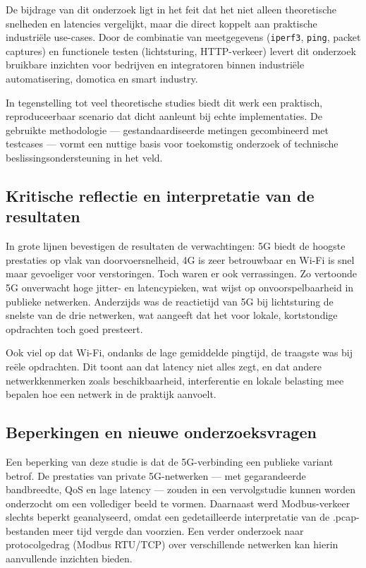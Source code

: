 De bijdrage van dit onderzoek ligt in het feit dat het niet alleen theoretische snelheden en latencies vergelijkt, maar die direct koppelt aan praktische industriële use-cases. Door de combinatie van meetgegevens (\texttt{iperf3}, \texttt{ping}, packet captures) en functionele testen (lichtsturing, HTTP-verkeer) levert dit onderzoek bruikbare inzichten voor bedrijven en integratoren binnen industriële automatisering, domotica en smart industry.

In tegenstelling tot veel theoretische studies biedt dit werk een praktisch, reproduceerbaar scenario dat dicht aanleunt bij echte implementaties. De gebruikte methodologie — gestandaardiseerde metingen gecombineerd met testcases — vormt een nuttige basis voor toekomstig onderzoek of technische beslissingsondersteuning in het veld.

\subsection{Kritische reflectie en interpretatie van de resultaten}

In grote lijnen bevestigen de resultaten de verwachtingen: 5G biedt de hoogste prestaties op vlak van doorvoersnelheid, 4G is zeer betrouwbaar en Wi-Fi is snel maar gevoeliger voor verstoringen. Toch waren er ook verrassingen. Zo vertoonde 5G onverwacht hoge jitter- en latencypieken, wat wijst op onvoorspelbaarheid in publieke netwerken. Anderzijds was de reactietijd van 5G bij lichtsturing de snelste van de drie netwerken, wat aangeeft dat het voor lokale, kortstondige opdrachten toch goed presteert.

Ook viel op dat Wi-Fi, ondanks de lage gemiddelde pingtijd, de traagste was bij reële opdrachten. Dit toont aan dat latency niet alles zegt, en dat andere netwerkkenmerken zoals beschikbaarheid, interferentie en lokale belasting mee bepalen hoe een netwerk in de praktijk aanvoelt.

\subsection{Beperkingen en nieuwe onderzoeksvragen}

Een beperking van deze studie is dat de 5G-verbinding een publieke variant betrof. De prestaties van private 5G-netwerken — met gegarandeerde bandbreedte, QoS en lage latency — zouden in een vervolgstudie kunnen worden onderzocht om een vollediger beeld te vormen. Daarnaast werd Modbus-verkeer slechts beperkt geanalyseerd, omdat een gedetailleerde interpretatie van de .pcap-bestanden meer tijd vergde dan voorzien. Een verder onderzoek naar protocolgedrag (Modbus RTU/TCP) over verschillende netwerken kan hierin aanvullende inzichten bieden.

